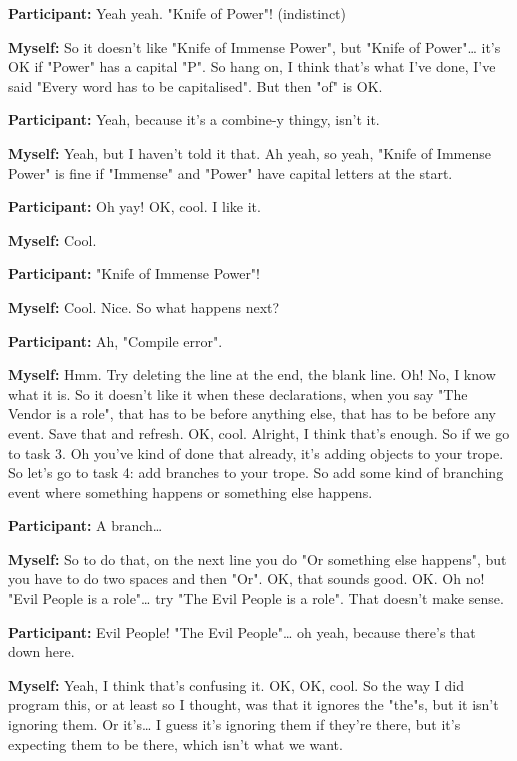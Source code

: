 \documentclass[11pt]{report}
\begin{document}
\begin{linenumbers}
\textbf{Participant:} Yeah yeah. "Knife of Power"! (indistinct)

\textbf{Myself:} So it doesn't like "Knife of Immense Power", but "Knife of Power"\ldots{} it's OK if "Power" has a capital "P". So hang on, I think that's what I've done, I've said "Every word has to be capitalised". But then "of" is OK.

\textbf{Participant:} Yeah, because it's a combine-y thingy, isn't it.

\textbf{Myself:} Yeah, but I haven't told it that. Ah yeah, so yeah, "Knife of Immense Power" is fine if "Immense" and "Power" have capital letters at the start.

\textbf{Participant:} Oh yay! OK, cool. I like it.

\textbf{Myself:} Cool.

\textbf{Participant:} "Knife of Immense Power"!

\textbf{Myself:} Cool. Nice. So what happens next?

\textbf{Participant:} Ah, "Compile error".

\textbf{Myself:} Hmm. Try deleting the line at the end, the blank line. Oh! No,
I know what it is. So it doesn't like it when these declarations, when you say
"The Vendor is a role", that has to be before anything else, that has to be
before any event. Save that and refresh. OK, cool. Alright, I think that's
enough. So if we go to task 3. Oh you've kind of done that already, it's adding
objects to your trope. So let's go to task 4: add branches to your trope. So add
some kind of branching event where something happens or something else
happens.

\textbf{Participant:} A branch\ldots{}

\textbf{Myself:} So to do that, on the next line you do "Or something else happens", but you have to do two spaces and then "Or". OK, that sounds good. OK. Oh no! "Evil People is a role"\ldots{} try "The Evil People is a role". That doesn't make sense.

\textbf{Participant:} Evil People! "The Evil People"\ldots{} oh yeah, because there's that down here.

\textbf{Myself:} Yeah, I think that's confusing it. OK, OK, cool. So the way I did program this, or at least so I thought, was that it ignores the "the"s, but it isn't ignoring them. Or it's\ldots{} I guess it's ignoring them if they're there, but it's expecting them to be there, which isn't what we want.


\end{linenumbers}
\end{document}
